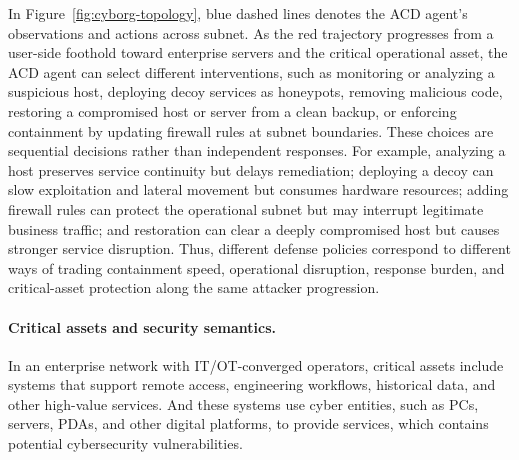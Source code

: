 \documentclass[sigconf,review,anonymous]{acmart}
\begin{document}
In Figure~\ref{fig:cyborg-topology}, blue dashed lines denotes the ACD agent's observations and actions across subnet.  
As the red trajectory progresses from a user-side foothold toward enterprise servers and the critical operational asset, the ACD agent can select different interventions, such as monitoring or analyzing a suspicious host, deploying decoy services as honeypots, removing malicious code, restoring a compromised host or server from a clean backup, or enforcing containment by updating firewall rules at subnet boundaries. 
These choices are sequential decisions rather than independent responses. 
For example, analyzing a host preserves service continuity but delays remediation; deploying a decoy can slow exploitation and lateral movement but consumes hardware resources; adding firewall rules can protect the operational subnet but may interrupt legitimate business traffic; and restoration can clear a deeply compromised host but causes stronger service disruption. 
Thus, different defense policies correspond to different ways of trading containment speed, operational disruption, response burden, and critical-asset protection along the same attacker progression.

\paragraph{Critical assets and security semantics.}

In an enterprise network with IT/OT-converged operators, critical assets include systems that support remote access, engineering workflows, historical data, and other high-value services. And these systems use cyber entities, such as PCs, servers, PDAs, and other digital platforms, to provide services, which contains potential cybersecurity vulnerabilities.
\end{document}
